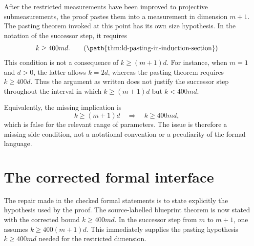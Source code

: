\documentclass[11pt]{article}
\begin{document}
After the restricted measurements have been improved to projective
submeasurements, the proof pastes them into a measurement in dimension \(m+1\).
The pasting theorem invoked at this point has its own size hypothesis.  In the
notation of the successor step, it requires
\begin{equation*}
  k\ge 400md.
  \tag{\path{thm:ld-pasting-in-induction-section}}
\end{equation*}
This condition is not a consequence of \(k\ge (m+1)d\).  For instance, when
\(m=1\) and \(d>0\), the latter allows \(k=2d\), whereas the pasting theorem
requires \(k\ge 400d\).  Thus the argument as written does not justify the
successor step throughout the interval in which \(k\ge (m+1)d\) but
\(k<400md\).

Equivalently, the missing implication is
\[
  k\ge (m+1)d
  \quad\Longrightarrow\quad
  k\ge 400md,
\]
which is false for the relevant range of parameters.  The issue is therefore a
missing side condition, not a notational convention or a peculiarity of the
formal language.

\section{The corrected formal interface}

The repair made in the checked formal statements is to state explicitly the
hypothesis used by the proof.  The source-labelled blueprint theorem is now
stated with the corrected bound \(k\ge 400md\).  In the successor step from
\(m\) to \(m+1\), one assumes \(k\ge 400(m+1)d\).  This immediately supplies the
pasting hypothesis \(k\ge 400md\) needed for the restricted dimension.
\end{document}
